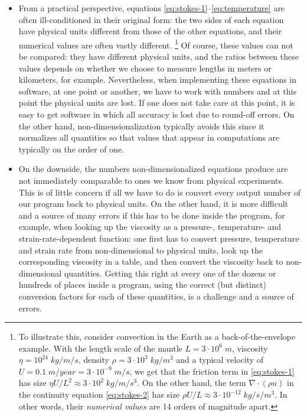 \documentclass{article}
\begin{document}
\begin{itemize}
  \item From a practical perspective, equations
  \eqref{eq:stokes-1}--\eqref{eq:temperature} are often ill-conditioned in
  their original form: the two sides of each equation have physical units
  different from those of the other equations, and their numerical values are
  often vastly different.%
  \footnote{To illustrate this, consider convection in the Earth as a
  back-of-the-envelope example.
  With the length scale of the mantle $L=3\cdot 10^6\;m$, viscosity
  $\eta=10^{24} \; kg/m/s$, density $\rho=3\cdot 10^3 \; kg/m^3$ and a typical
  velocity of $U=0.1\;m/year=3\cdot 10^{-9}\; m/s$, we get that the friction
  term in \eqref{eq:stokes-1} has size $\eta U/L^2 \approx 3\cdot 10^2 \;
  kg/m/s^3$. On the other hand, the term $\nabla\cdot(\rho u)$ in the
  continuity equation \eqref{eq:stokes-2} has size $\rho U/L\approx 3\cdot
  10^{-12} \; kg/s/m^3$. In other words, their \textit{numerical values} are 14
  orders of magnitude apart.}
  Of course, these values can not be compared: they have different physical
  units, and the ratios between these values depends on whether we choose to
  measure lengths in meters or kilometers, for example. Nevertheless, when
  implementing these equations in software, at one point or another, we have to
  work with numbers and at this point the physical units are lost. If one does
  not take care at this point, it is easy to get software in which all accuracy
  is lost due to round-off errors. On the other hand, non-dimensionalization
  typically avoids this since it normalizes all quantities so that values that
  appear in computations are typically on the order of one.

  \item On the downside, the numbers non-dimensionalized equations produce are
  not immediately comparable to ones we know from physical experiments. This is
  of little concern if all we have to do is convert every output number of our
  program back to physical units. On the other hand, it is more difficult and a
  source of many errors if this has to be done inside the program, for example,
  when looking up the viscosity as a pressure-, temperature- and
  strain-rate-dependent function: one first has to convert pressure,
  temperature and strain rate from non-dimensional to physical units, look up
  the corresponding viscosity in a table, and then convert the viscosity back to
  non-dimensional quantities. Getting this right at every one of the dozens or
  hundreds of places inside a program, using the correct (but distinct)
  conversion factors for each of these quantities, is a challenge and a source
  of errors.


\end{itemize}
\end{document}
